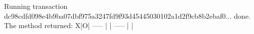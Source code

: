 \begin{shellbox}\begin{ttlst}
Running transaction dc98cdfd098e4b9ba07dbf975a3247fd9f93d45445030102a1d2f9cb8b2ebaf0... done.
The method returned:
X|O| 
-----
 | | 
-----
 | | 
\end{ttlst}\end{shellbox}
